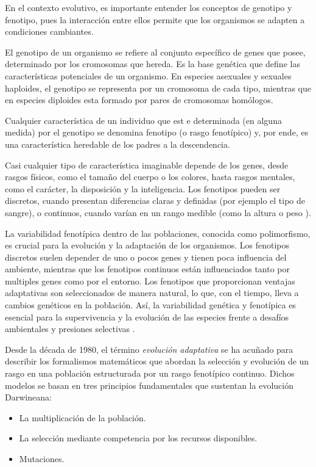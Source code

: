 En el contexto evolutivo, es importante entender los conceptos de genotipo y fenotipo, pues la interacción entre ellos permite que los organismos se adapten a condiciones cambiantes.

El genotipo de un organismo se refiere al conjunto específico de genes que posee, determinado por los cromosomas que hereda. Es la base genética que define las características potenciales de un organismo. En especies asexuales y sexuales haploides, el genotipo se representa por un cromosoma de cada tipo, mientras que en especies diploides esta formado por pares de cromosomas homólogos.

Cualquier característica de un individuo que est e determinada (en alguna medida) por el genotipo se denomina fenotipo (o rasgo fenotípico) y, por ende, es una característica heredable de los padres a la descendencia.

Casi cualquier tipo de característica imaginable depende de los genes, desde rasgos físicos, como el tamaño del cuerpo o los colores, hasta rasgos mentales, como el carácter, la disposición y la inteligencia. Los fenotipos pueden ser discretos, cuando presentan diferencias claras y definidas (por ejemplo el tipo de sangre), o continuos, cuando varían en un rango medible (como la altura o peso \citep{Dercole}).

La variabilidad fenotípica dentro de las poblaciones, conocida como polimorfismo, es crucial para la evolución y la adaptación de los organismos. Los fenotipos discretos suelen depender de uno o pocos genes y tienen poca influencia del ambiente, mientras que los fenotipos continuos están influenciados tanto por multiples genes como por el entorno. Los fenotipos que proporcionan ventajas adaptativas son seleccionados de manera natural, lo que, con el tiempo, lleva a cambios genéticos en la población. Así, la variabilidad genética y fenotípica es esencial para la supervivencia y la evolución de las especies frente a desafíos ambientales y presiones selectivas \citep{Dercole}.

\citep{Mirrahimi2011} Desde la década de 1980, el término \textit{evolución adaptativa} se ha acuñado para describir los formalismos matemáticos que abordan la selección y evolución de un rasgo en una población estructurada por un rasgo fenotípico continuo. Dichos modelos se basan en tres principios fundamentales que sustentan la evolución Darwineana:

\begin{itemize}
	\item {

	      {La multiplicación de la población.}

	      }

	\item {

	      {La selección mediante competencia por los recursos disponibles.}
	      }

	\item {

	      {Mutaciones.}

	      }
\end{itemize}


